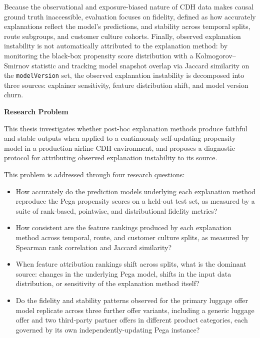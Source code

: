 \documentclass[oneside]{memoir} %
\begin{document}
Because the observational and exposure-biased nature of CDH data makes causal ground truth inaccessible, evaluation focuses on fidelity, defined as how accurately explanations reflect the model’s predictions, and stability across temporal splits, route subgroups, and customer culture cohorts. Finally, observed explanation instability is not automatically attributed to the explanation method: by monitoring the black-box propensity score distribution with a Kolmogorov--Smirnov statistic and tracking model snapshot overlap via Jaccard similarity on the \texttt{modelVersion} set, the observed explanation instability is decomposed into three sources: explainer sensitivity, feature distribution shift, and model version churn.

\vspace{1em}

\noindent\textbf{Research Problem}

\noindent This thesis investigates whether post-hoc explanation methods produce faithful and stable outputs when applied to a continuously self-updating propensity model in a production airline CDH environment, and proposes a diagnostic protocol for attributing observed explanation instability to its source.

\vspace{0.8em}
\noindent This problem is addressed through four research questions:

\begin{itemize}
\item[\textbf{RQ1}] How accurately do the prediction models underlying each explanation method reproduce the Pega propensity scores on a held-out test set, as measured by a suite of rank-based, pointwise, and distributional fidelity metrics?
\item[\textbf{RQ2}] How consistent are the feature rankings produced by each explanation method across temporal, route, and customer culture splits, as measured by Spearman rank correlation and Jaccard similarity?
\item[\textbf{RQ3}] When feature attribution rankings shift across splits, what is the dominant source: changes in the underlying Pega model, shifts in the input data distribution, or sensitivity of the explanation method itself?
\item[\textbf{RQ4}] Do the fidelity and stability patterns observed for the primary luggage offer model replicate across three further offer variants, including a generic luggage offer and two third-party partner offers in different product categories, each governed by its own independently-updating Pega instance?
\end{itemize}
\end{document}
